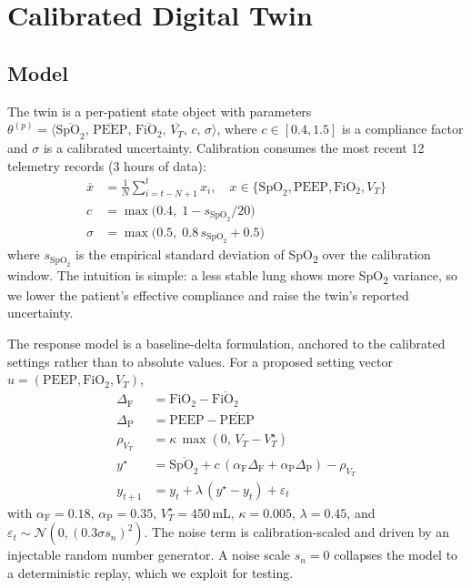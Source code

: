 \documentclass[conference]{IEEEtran}
\begin{document}
\section{Calibrated Digital Twin}
\label{sec:twin}

\subsection{Model}
The twin is a per-patient state object with parameters $\theta^{(p)} = \langle \overline{\text{SpO}_2},\,\overline{\text{PEEP}},\,\overline{\text{FiO}_2},\,\overline{V_T},\,c,\,\sigma \rangle$, where $c\in[0.4,1.5]$ is a compliance factor and $\sigma$ is a calibrated uncertainty. Calibration consumes the most recent 12 telemetry records (3 hours of data):
\begin{align}
  \overline{x}      &= \tfrac{1}{N}\sum_{i=t-N+1}^{t} x_i, \quad x \in \{\text{SpO}_2, \text{PEEP}, \text{FiO}_2, V_T\}\\
  c                 &= \max\!\big(0.4,\; 1 - s_{\text{SpO}_2}/20\big)\\
  \sigma            &= \max\!\big(0.5,\; 0.8\,s_{\text{SpO}_2} + 0.5\big)
\end{align}
where $s_{\text{SpO}_2}$ is the empirical standard deviation of SpO\textsubscript{2} over the calibration window. The intuition is simple: a less stable lung shows more SpO\textsubscript{2} variance, so we lower the patient's effective compliance and raise the twin's reported uncertainty.

The response model is a baseline-delta formulation, anchored to the calibrated settings rather than to absolute values. For a proposed setting vector $u = (\text{PEEP}, \text{FiO}_2, V_T)$,
\begin{align}
  \Delta_{\text{F}} &= \text{FiO}_2 - \overline{\text{FiO}_2}\\
  \Delta_{\text{P}} &= \text{PEEP} - \overline{\text{PEEP}}\\
  \rho_{V_T}        &= \kappa\,\max(0,\, V_T - V_T^{\star})\\
  y^{\star}         &= \overline{\text{SpO}_2} + c\,(\alpha_{\text{F}}\Delta_{\text{F}} + \alpha_{\text{P}}\Delta_{\text{P}}) - \rho_{V_T}\\
  y_{t+1}           &= y_t + \lambda\,(y^{\star} - y_t) + \varepsilon_t
\end{align}
with $\alpha_{\text{F}}{=}0.18$, $\alpha_{\text{P}}{=}0.35$, $V_T^{\star}{=}450$\,mL, $\kappa{=}0.005$, $\lambda{=}0.45$, and $\varepsilon_t \sim \mathcal{N}(0,(0.3\sigma s_n)^2)$. The noise term is calibration-scaled and driven by an injectable random number generator. A noise scale $s_n=0$ collapses the model to a deterministic replay, which we exploit for testing.
\end{document}
